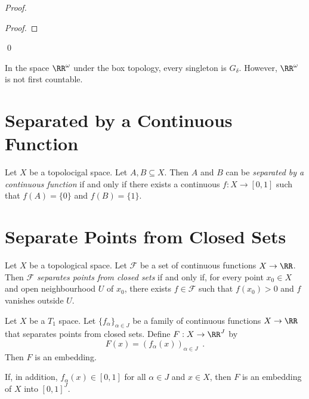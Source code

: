 \begin{proof}
    \pf
    \begin{proof}
    \end{proof}
    \qed
\end{proof}

\begin{example}
    In the space $\RR^\omega$ under the box topology, every singleton is $G_\delta$.
    However, $\RR^\omega$ is not first countable.
\end{example}

\section{Separated by a Continuous Function}

\begin{definition}
    Let $X$ be a topolocigal space. Let $A, B \subseteq X$. Then $A$ and $B$
    can be \emph{separated by a continuous function} if and only if there exists
    a continuous $f : X \rightarrow [0,1]$ such that $f(A) = \{0\}$ and
    $f(B) = \{1\}$.
\end{definition}

\section{Separate Points from Closed Sets}

\begin{definition}
    Let $X$ be a topological space. Let $\mathcal{F}$ be a set of continuous
    functions $X \rightarrow \RR$. Then $\mathcal{F}$ \emph{separates points
    from closed sets} if and only if, for every point $x_0 \in X$
    and open neighbourhood $U$ of $x_0$, there exists $f \in \mathcal{F}$
    such that $f(x_0) > 0$ and $f$ vanishes outside $U$.
\end{definition}

\begin{theorem}
    Let $X$ be a $T_1$ space. Let $\{ f_\alpha \}_{\alpha \in J}$ be a family of
    continuous functions $X \rightarrow \RR$ that separates points from
    closed sets. Define $F : X
    \rightarrow \RR^J$ by
    \[ F(x) = (f_\alpha(x))_{\alpha \in J} \enspace . \]
    Then $F$ is an embedding.

    If, in addition, $f_\alpha(x) \in [0,1]$ for all $\alpha \in J$ and $x \in X$,
    then $F$ is an embedding of $X$ into $[0,1]^J$.
\end{theorem}


